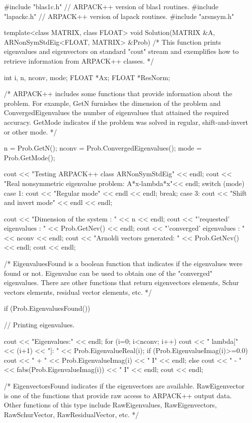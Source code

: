 \begin{cppcode}
#include "blas1c.h"   // ARPACK++ version of blas1 routines.
#include "lapackc.h"  // ARPACK++ version of lapack routines.
#include "arsnsym.h"

template<class MATRIX, class FLOAT>
void Solution(MATRIX &A, ARNonSymStdEig<FLOAT, MATRIX> &Prob)
/*
This function prints eigenvalues and eigenvectors on 
standard "cout" stream and exemplifies how to retrieve 
information from ARPACK++ classes.
*/
{
	int   i, n, nconv, mode;
	FLOAT *Ax;
	FLOAT *ResNorm;
	
	/*
	ARPACK++ includes some functions that provide information
	about the problem. For example, GetN furnishes the dimension
	of the problem and ConvergedEigenvalues the number of 
	eigenvalues that attained the required accuracy. GetMode 
	indicates if the problem was solved in regular, 
	shift-and-invert or other mode.
	*/
	
	n     = Prob.GetN();
	nconv = Prob.ConvergedEigenvalues();
	mode  = Prob.GetMode();
	
	cout << "Testing ARPACK++ class ARNonSymStdEig" << endl;
	cout << "Real nonsymmetric eigenvalue problem: A*x-lambda*x"<< endl;
	switch (mode) {
		case 1:
		cout << "Regular mode" << endl << endl;
		break;
		case 3: 
		cout << "Shift and invert mode" << endl << endl;
	}
	
	cout << "Dimension of the system  : " << n             << endl;
	cout << "'requested' eigenvalues  : " << Prob.GetNev() << endl;
	cout << "'converged' eigenvalues  : " << nconv         << endl;
	cout << "Arnoldi vectors generated: " << Prob.GetNcv() << endl;
	cout << endl;
	
	/*
	EigenvaluesFound is a boolean function that indicates
	if the eigenvalues were found or not. Eigenvalue can be
	used to obtain one of the "converged" eigenvalues. There
	are other functions that return eigenvectors elements,
	Schur vectors elements, residual vector elements, etc.
	*/
	
	if (Prob.EigenvaluesFound()) {
		
		// Printing eigenvalues.
		
		cout << "Eigenvalues:" << endl;
		for (i=0; i<nconv; i++) {
			cout << "  lambda[" << (i+1) << "]: " << Prob.EigenvalueReal(i); 
			if (Prob.EigenvalueImag(i)>=0.0) {
				cout << " + " << Prob.EigenvalueImag(i) << " I" << endl;
			}
			else {
				cout << " - " << fabs(Prob.EigenvalueImag(i)) << " I" << endl;
			}
		}
		cout << endl;
	}
	
	/*
	EigenvectorsFound indicates if the eigenvectors are
	available. RawEigenvector is one of the functions that
	provide raw access to ARPACK++ output data. Other functions
	of this type include RawEigenvalues, RawEigenvectors, 
	RawSchurVector, RawResidualVector, etc.
	*/
	
}
\end{cppcode}
